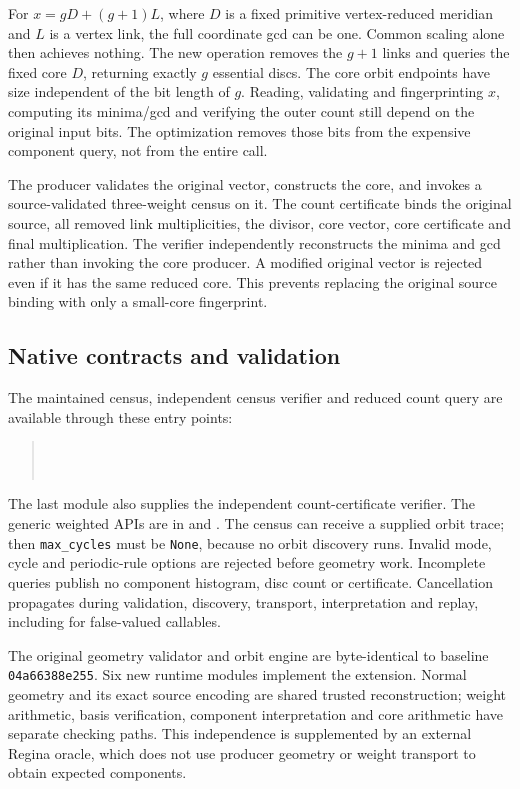 For $x=gD+(g+1)L$, where $D$ is a fixed primitive vertex-reduced meridian and
$L$ is a vertex link, the full coordinate gcd can be one. Common scaling
alone then achieves nothing. The new operation removes the $g+1$ links and
queries the fixed core $D$, returning exactly $g$ essential discs. The core
orbit endpoints have size independent of the bit length of $g$. Reading,
validating and fingerprinting $x$, computing its minima/gcd and verifying the
outer count still depend on the original input bits. The optimization removes
those bits from the expensive component query, not from the entire call.

The producer validates the original vector, constructs the core, and invokes
a source-validated three-weight census on it. The count certificate binds the
original source, all removed link multiplicities, the divisor, core vector,
core certificate and final multiplication. The verifier independently
reconstructs the minima and gcd rather than invoking the core producer.
A modified original vector is rejected even if it has the same reduced core.
This prevents replacing the original source binding with only a small-core
fingerprint.

\subsection{Native contracts and validation}

The maintained census, independent census verifier and reduced count query
are available through these entry points:
\begin{quote}\small
{}\\
\\
\end{quote}
The last module also supplies the independent count-certificate verifier.
The generic weighted APIs are in  and
. The census can receive a supplied orbit trace;
then \texttt{max\_cycles} must be \texttt{None}, because no orbit discovery
runs. Invalid mode, cycle and periodic-rule options are rejected before
geometry work. Incomplete queries publish no component histogram, disc count
or certificate. Cancellation propagates during validation, discovery,
transport, interpretation and replay, including for false-valued callables.

The original geometry validator and orbit engine are byte-identical to baseline
\texttt{04a66388e255}. Six new runtime modules implement the extension. Normal
geometry and its exact source encoding are shared trusted reconstruction;
weight arithmetic, basis verification, component interpretation and core
arithmetic have separate checking paths. This independence is supplemented
by an external Regina oracle, which does not use producer geometry or weight
transport to obtain expected components.

